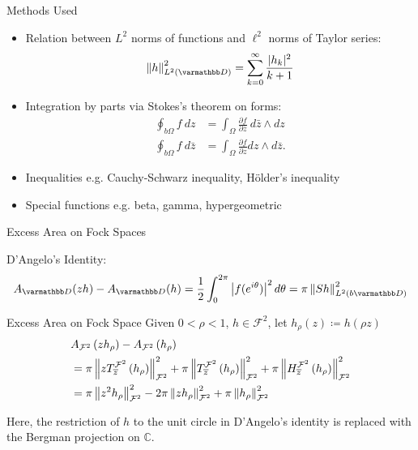 \documentclass{reu_beamer}
\begin{document}
\begin{frame}{Methods Used}
    \begin{itemize}
        \item Relation between $L^{2}$ norms of functions and $\ell^{2}$ norms of Taylor series:
        \[\norm{h}^2_{L^2(\mathbb{D})} = \sum^\infty_{k = 0} \frac{|h_k|^2}{k+1}\]
        \item Integration by parts via Stokes's theorem on forms:
        \begin{align*}
            \oint_{b\Omega}f\: dz &= \int_{\Omega} \frac{\partial f}{\partial \bar{z}}\:d\bar{z}\wedge dz\\
            \oint_{b\Omega}f\:d\bar{z} &= \int_{\Omega}\frac{\partial f}{\partial z}dz\wedge d\bar{z}.
        \end{align*}
        \item Inequalities e.g. Cauchy-Schwarz inequality, H\"{o}lder's inequality 
        \item Special functions e.g. beta, gamma, hypergeometric 
    \end{itemize}
\end{frame}
\begin{frame}{Excess Area on Fock Spaces}
    \begin{center}
        \small
        D'Angelo's Identity: 
        \[A_{\mathbb{D}}(zh) - A_{\mathbb{D}}(h) = \frac{1}{2}\int_0^{2\pi}\left|f(e^{i\theta})\right|^2d\theta = \pi \norm{Sh}_{L^{2}(b\mathbb{D})}^2\]
    \end{center}
    \begin{block}{Excess Area on Fock Space}
    Given $0 < \rho < 1$, $h\in \mathcal{F}^2 $, let \(h_\rho(z) \coloneq h(\rho z)\)
    \begin{align*}
        &A_{\mathcal{F}^2}\left(zh_{\rho}\right) - A_{\mathcal{F}^2}\left(h_{\rho}\right) \\
        &= \pi \left\Vert zT^{\mathcal{F}^2}_{\overline{z}}\left(h_{\rho}\right) \right\Vert_{\mathcal{F}^2}^2+\pi\left\Vert T^{\mathcal{F}^2}_{\overline{z}}\left(h_{\rho}\right) \right\Vert_{\mathcal{F}^2}^2+ \pi\left\Vert H^{\mathcal{F}^2}_{\overline{z}}\left(h_{\rho}\right) \right\Vert_{\mathcal{F}^2}^2\\
        &= \pi\left\Vert z^{2}h_\rho \right\Vert^2_{\mathcal{F}^2}-2\pi\left\Vert zh_\rho \right\Vert^2_{\mathcal{F}^2}+\pi\left\Vert h_\rho \right\Vert^2_{\mathcal{F}^2}
    \end{align*}
    \end{block}  
    Here, the restriction of \(h\) to the unit circle in D'Angelo's identity is replaced with the Bergman projection on $\mathbb{C}$.\\
\end{frame}
\end{document}
